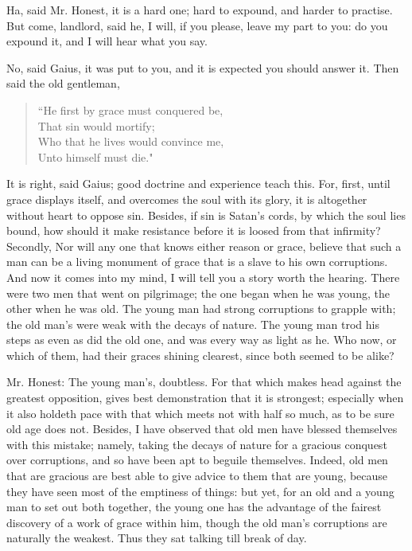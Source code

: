 Ha, said Mr. Honest, it is a hard one; hard to expound, and harder to practise. But come, landlord, said he, I will, if you please, leave my part to you: do you expound it, and I will hear what you say.

No, said Gaius, it was put to you, and it is expected you should answer it. Then said the old gentleman,
\begin{verse}
``He first by grace must conquered be,\\
That sin would mortify;\\
Who that he lives would convince me,\\
Unto himself must die."\\
\end{verse}

It is right, said Gaius; good doctrine and experience teach this. For, first, until grace displays itself, and overcomes the soul with its glory, it is altogether without heart to oppose sin. Besides, if sin is Satan's cords, by which the soul lies bound, how should it make resistance before it is loosed from that infirmity? Secondly, Nor will any one that knows either reason or grace, believe that such a man can be a living monument of grace that is a slave to his own corruptions. And now it comes into my mind, I will tell you a story worth the hearing. There were two men that went on pilgrimage; the one began when he was young, the other when he was old. The young man had strong corruptions to grapple with; the old man's were weak with the decays of nature. The young man trod his steps as even as did the old one, and was every way as light as he. Who now, or which of them, had their graces shining clearest, since both seemed to be alike?

Mr. Honest: The young man's, doubtless. For that which makes head against the greatest opposition, gives best demonstration that it is strongest; especially when it also holdeth pace with that which meets not with half so much, as to be sure old age does not. Besides, I have observed that old men have blessed themselves with this mistake; namely, taking the decays of nature for a gracious conquest over corruptions, and so have been apt to beguile themselves. Indeed, old men that are gracious are best able to give advice to them that are young, because they have seen most of the emptiness of things: but yet, for an old and a young man to set out both together, the young one has the advantage of the fairest discovery of a work of grace within him, though the old man's corruptions are naturally the weakest. Thus they sat talking till break of day.

